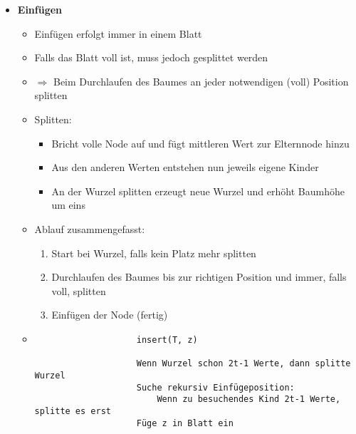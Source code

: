 \begin{itemize}
\pagebreak

        \item \textbf{Einfügen}
            \begin{itemize}
                \item Einfügen erfolgt immer in einem Blatt
                \item Falls das Blatt voll ist, muss jedoch gesplittet werden
                \item $\Rightarrow$ Beim Durchlaufen des Baumes an jeder notwendigen (voll) Position splitten
                \item Splitten:
                    \begin{itemize}
                        \item Bricht volle Node auf und fügt mittleren Wert zur Elternnode hinzu
                        \item Aus den anderen Werten entstehen nun jeweils eigene Kinder
                        \item An der Wurzel splitten erzeugt neue Wurzel und erhöht Baumhöhe um eins
                    \end{itemize}
                \item Ablauf zusammengefasst:
                    \begin{enumerate}
                        \item Start bei Wurzel, falls kein Platz mehr splitten
                        \item Durchlaufen des Baumes bis zur richtigen Position und immer, falls voll, splitten
                        \item Einfügen der Node (fertig)
                    \end{enumerate}
                \item[]
                    \begin{verbatim}
                    insert(T, z)

                    Wenn Wurzel schon 2t-1 Werte, dann splitte Wurzel
                    Suche rekursiv Einfügeposition:
                        Wenn zu besuchendes Kind 2t-1 Werte, splitte es erst
                    Füge z in Blatt ein
                    \end{verbatim}
            \end{itemize}


\end{itemize}
